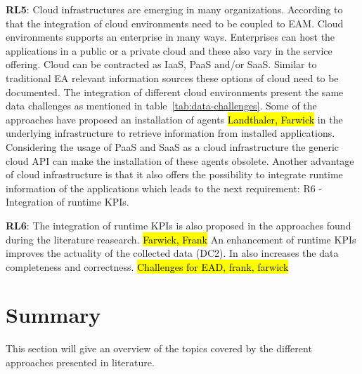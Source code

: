 \textbf{RL5}: Cloud infrastructures are emerging in many organizations. 
According to that the integration of cloud environments need to be coupled to EAM. %
Cloud environments supports an enterprise in many ways. Enterprises can host the applications in a public or a private cloud and these also vary in the service offering. Cloud can be contracted as IaaS, PaaS and/or SaaS. Similar to traditional EA relevant information sources these options of cloud need to be documented. The integration of different cloud environments present the same data challenges as mentioned in table~\ref{tab:data-challenges}. Some of the approaches have proposed an installation of agents \hl{Landthaler, Farwick} in the underlying infrastructure to retrieve information from installed applications. Considering the usage of PaaS and SaaS as a cloud infrastructure the generic cloud API can make the installation of these agents obsolete.
Another advantage of cloud infrastructure is that it also offers the possibility to integrate runtime information of the applications which leads to the next requirement: R6 - Integration of runtime KPIs.

\textbf{RL6}: The integration of runtime KPIs is also proposed in the approaches found during the literature reasearch. \hl{Farwick, Frank}
An enhancement of runtime KPIs improves the actuality of the collected data (DC2). In also increases the data completeness and correctness. \hl{Challenges for EAD, frank, farwick}

\section{Summary}

This section will give an overview of the topics covered by the different approaches presented in literature. 

